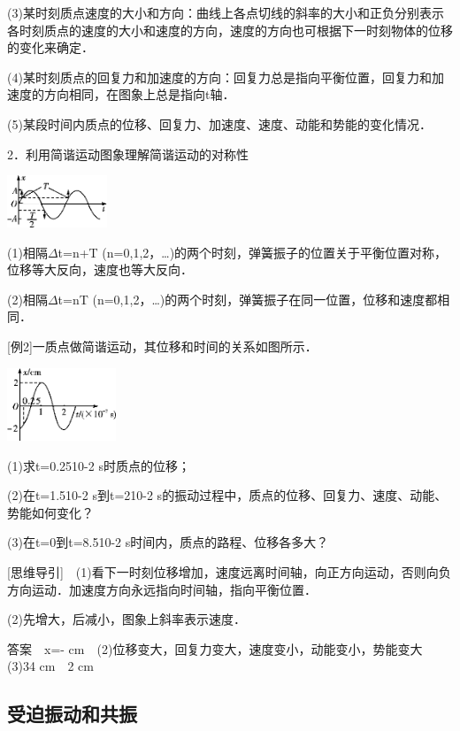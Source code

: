 (3)某时刻质点速度的大小和方向：曲线上各点切线的斜率的大小和正负分别表示各时刻质点的速度的大小和速度的方向，速度的方向也可根据下一时刻物体的位移的变化来确定．

(4)某时刻质点的回复力和加速度的方向：回复力总是指向平衡位置，回复力和加速度的方向相同，在图象上总是指向t轴．

(5)某段时间内质点的位移、回复力、加速度、速度、动能和势能的变化情况．

2．利用简谐运动图象理解简谐运动的对称性

\begin{center}\includegraphics[width=1.17917in,height=0.61319in]{media/image517.png}\end{center}
(1)相隔$\Delta$t=n+T
(n=0,1,2，\ldots)的两个时刻，弹簧振子的位置关于平衡位置对称，位移等大反向，速度也等大反向．

(2)相隔$\Delta$t=nT
(n=0,1,2，\ldots)的两个时刻，弹簧振子在同一位置，位移和速度都相同．

{[}例2{]}一质点做简谐运动，其位移和时间的关系如图所示．

\begin{center}\includegraphics[width=1.28333in,height=0.85833in]{media/image518.png}\end{center}
(1)求t=0.2510-2 s时质点的位移；

(2)在t=1.510-2 s到t=210-2
s的振动过程中，质点的位移、回复力、速度、动能、势能如何变化？

(3)在t=0到t=8.510-2 s时间内，质点的路程、位移各多大？

{[}思维导引{]}　(1)看下一时刻位移增加，速度远离时间轴，向正方向运动，否则向负方向运动．加速度方向永远指向时间轴，指向平衡位置．

(2)先增大，后减小，图象上斜率表示速度．

答案　x=-
cm　(2)位移变大，回复力变大，速度变小，动能变小，势能变大　(3)34 cm　2
cm

\subsection{受迫振动和共振}


